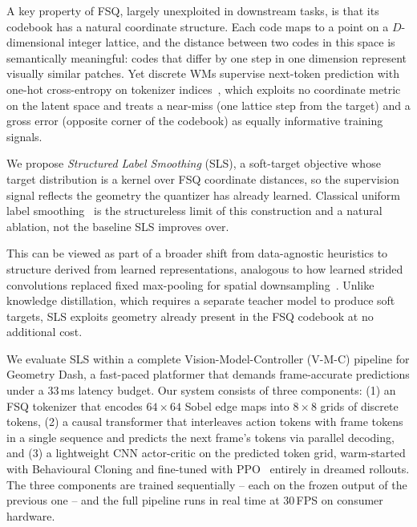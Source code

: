 \documentclass{article}
\newcommand{\gridsize}{8 \times 8}
\newcommand{\imgsize}{64 \times 64}
\begin{document}
A key property of FSQ, largely unexploited in downstream tasks, is that its codebook has a natural coordinate structure.
Each code maps to a point on a $D$-dimensional integer lattice, and the distance between two codes in this space is semantically meaningful: codes that differ by one step in one dimension represent visually similar patches.
Yet discrete WMs supervise next-token prediction with one-hot cross-entropy on tokenizer indices~\citep{micheli2023iris}, which exploits no coordinate metric on the latent space and treats a near-miss (one lattice step from the target) and a gross error (opposite corner of the codebook) as equally informative training signals.

We propose \emph{Structured Label Smoothing} (SLS), a soft-target objective whose target distribution is a kernel over FSQ coordinate distances, so the supervision signal reflects the geometry the quantizer has already learned.
Classical uniform label smoothing~\citep{szegedy2016rethinking} is the structureless limit of this construction and a natural ablation, not the baseline SLS improves over.

This can be viewed as part of a broader shift from data-agnostic heuristics to structure derived from learned representations, analogous to how learned strided convolutions replaced fixed max-pooling for spatial downsampling~\citep{springenberg2015striving}.
Unlike knowledge distillation, which requires a separate teacher model to produce soft targets, SLS exploits geometry already present in the FSQ codebook at no additional cost.

We evaluate SLS within a complete Vision-Model-Controller (V-M-C) pipeline for Geometry Dash, a fast-paced platformer that demands frame-accurate predictions under a 33\,ms latency budget.
Our system consists of three components: (1) an FSQ tokenizer that encodes $\imgsize$ Sobel edge maps into $\gridsize$ grids of discrete tokens, (2) a causal transformer that interleaves action tokens with frame tokens in a single sequence and predicts the next frame's tokens via parallel decoding, and (3) a lightweight CNN actor-critic on the predicted token grid, warm-started with Behavioural Cloning and fine-tuned with PPO~\citep{schulman2017ppo} entirely in dreamed rollouts.
The three components are trained sequentially -- each on the frozen output of the previous one -- and the full pipeline runs in real time at 30\,FPS on consumer hardware.
\end{document}
